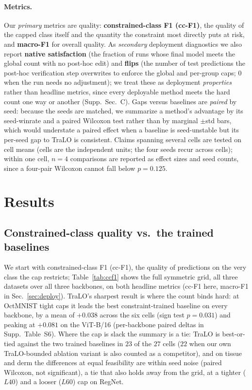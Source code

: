 \documentclass[letterpaper]{article} %
\begin{document}
\paragraph{Metrics.}
Our \emph{primary} metrics are quality: \textbf{constrained-class F1 (cc-F1)}, the quality
of the capped class itself and the quantity the constraint most directly puts at risk, and
\textbf{macro-F1} for overall quality. As \emph{secondary} deployment diagnostics we also
report \textbf{native satisfaction} (the fraction of runs whose final model meets the global
count with no post-hoc edit) and \textbf{flips} (the number of test predictions the post-hoc
verification step overwrites to enforce the global and per-group caps; $0$ when the run needs
no adjustment); we treat these as deployment \emph{properties} rather than headline metrics,
since every deployable method meets the hard count one way or another
(Supp.~Sec.~C). Gaps versus baselines are \emph{paired} by seed: because the seeds are
matched, we summarize a method's advantage by its seed-winrate and a paired Wilcoxon test
rather than by marginal $\pm$std bars, which would understate a paired effect when a
baseline is seed-unstable but its per-seed gap to TraLO is consistent. Claims spanning
several cells are tested on cell means (cells are the independent units; the four seeds
recur across cells); within one cell, $n{=}4$ comparisons are reported as effect sizes
and seed counts, since a four-pair Wilcoxon cannot fall below $p{=}0.125$.

\section{Results}
\label{sec:results}

\subsection{Constrained-class quality vs.\ the trained baselines}
\label{sec:oct}

We start with constrained-class F1 (cc-F1), the quality of predictions on the very
class the cap restricts; Table~\ref{tab:ccf1} shows the full symmetric grid, all three
datasets over all three backbones, on both headline metrics (cc-F1 here, macro-F1 in
Sec.~\ref{sec:deploy}). TraLO's sharpest result is where the count binds
hard: at OctMNIST tight caps it leads the best constraint-trained baseline on every
backbone, by a mean of $+0.038$ across the six cells (sign test $p{=}0.031$) and peaking
at $+0.081$ on the ViT-B/16 (per-backbone paired deltas in Supp.~Table~S6). Where the cap is slack the
summary is a tie: TraLO is best-or-tied against the two trained baselines in $23$ of the
$27$ cells ($22$ when our own TraLO-bounded ablation variant is also counted as a
competitor), and on tissue and derm the differences at equal feasibility are within seed noise
(paired Wilcoxon, not significant), a tie that also holds away from the grid, at a
tighter ($L40$) and a looser ($L60$) cap on RegNet.
\end{document}
